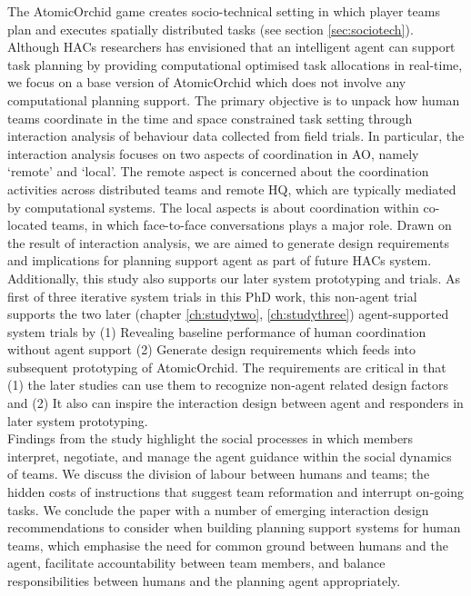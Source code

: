 The AtomicOrchid game creates socio-technical setting in which player teams plan and executes spatially distributed tasks (see section \ref{sec:sociotech}). Although HACs researchers has envisioned that an intelligent agent can support task planning by providing computational optimised task allocations in real-time, we focus on a base version of AtomicOrchid which does not involve any computational planning support. The primary objective is to unpack how human teams coordinate in the time and space constrained task setting through interaction analysis of behaviour data collected from field trials. In particular, the interaction analysis focuses on two aspects of coordination in AO, namely `remote' and `local'. The remote aspect is concerned about the coordination activities across distributed teams and remote HQ, which are typically mediated by computational systems. The local aspects is about coordination within co-located teams, in which face-to-face conversations plays a major role. Drawn on the result of interaction analysis, we are aimed to generate design requirements and implications for planning support agent as part of future HACs system.      \\

Additionally, this study also supports our later system prototyping and trials. As first of three iterative system trials in this PhD work, this non-agent trial supports the two later (chapter \ref{ch:studytwo}, \ref{ch:studythree}) agent-supported system trials by (1) Revealing baseline performance of human coordination without agent support (2) Generate design requirements which feeds into subsequent prototyping of AtomicOrchid. The requirements are critical in that (1) the later studies can use them to recognize non-agent related design factors and (2) It also can inspire the interaction design between agent and responders in later system prototyping.  \\

Findings from the study highlight the social processes in which members interpret, negotiate, and manage the agent guidance within the social dynamics of teams. We discuss the division of labour between humans and teams; the hidden costs of instructions that suggest team reformation and interrupt on-going tasks. We conclude the paper with a number of emerging interaction design recommendations to consider when building planning support systems for human teams, which emphasise the need for common ground between humans and the agent, facilitate accountability between team members, and balance responsibilities between humans and the planning agent appropriately.\\

